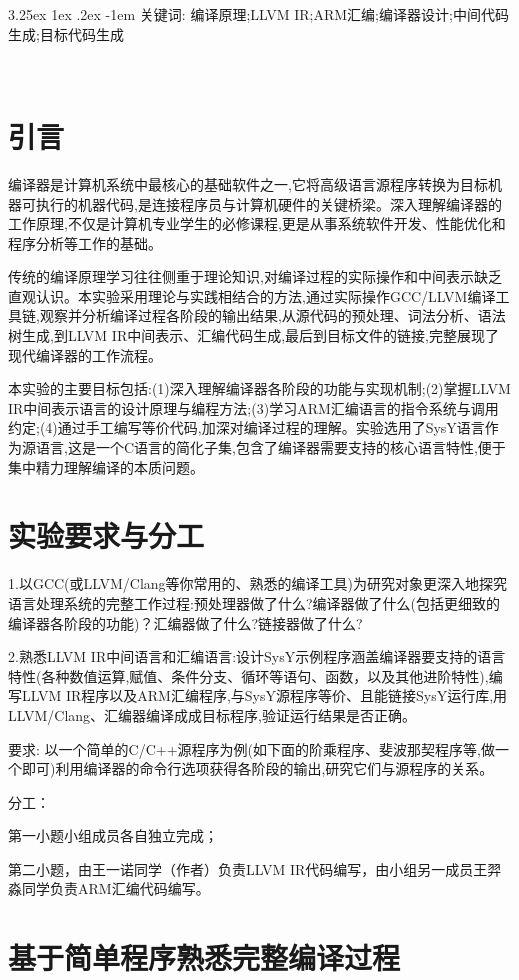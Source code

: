 \documentclass[a4paper]{article}
\makeatletter
\renewcommand\paragraph{\@startsection{paragraph}{5}{\z@}%
	{3.25ex \@plus1ex \@minus.2ex}%
	{-1em}%
	{\normalfont\normalsize\bfseries}}
\makeatother
\begin{document}
\paragraph{关键词}: 编译原理;LLVM IR;ARM汇编;编译器设计;中间代码生成;目标代码生成

​\section{引言}
编译器是计算机系统中最核心的基础软件之一,它将高级语言源程序转换为目标机器可执行的机器代码,是连接程序员与计算机硬件的关键桥梁。深入理解编译器的工作原理,不仅是计算机专业学生的必修课程,更是从事系统软件开发、性能优化和程序分析等工作的基础。

传统的编译原理学习往往侧重于理论知识,对编译过程的实际操作和中间表示缺乏直观认识。本实验采用理论与实践相结合的方法,通过实际操作GCC/LLVM编译工具链,观察并分析编译过程各阶段的输出结果,从源代码的预处理、词法分析、语法树生成,到LLVM IR中间表示、汇编代码生成,最后到目标文件的链接,完整展现了现代编译器的工作流程。

本实验的主要目标包括:(1)深入理解编译器各阶段的功能与实现机制;(2)掌握LLVM IR中间表示语言的设计原理与编程方法;(3)学习ARM汇编语言的指令系统与调用约定;(4)通过手工编写等价代码,加深对编译过程的理解。实验选用了SysY语言作为源语言,这是一个C语言的简化子集,包含了编译器需要支持的核心语言特性,便于集中精力理解编译的本质问题。

\section{实验要求与分工}
1.以GCC(或LLVM/Clang等你常用的、熟悉的编译工具)为研究对象更深入地探究语言处理系统的完整工作过程:预处理器做了什么?编译器做了什么(包括更细致的编译器各阶段的功能)？汇编器做了什么?链接器做了什么?

2.熟悉LLVM IR中间语言和汇编语言:设计SysY示例程序涵盖编译器要支持的语言特性(各种数值运算,赋值、条件分支、循环等语句、函数，以及其他进阶特性),编写LLVM IR程序以及ARM汇编程序,与SysY源程序等价、且能链接SysY运行库,用LLVM/Clang、汇编器编译成成目标程序,验证运行结果是否正确。


要求:
以一个简单的C/C++源程序为例(如下面的阶乘程序、斐波那契程序等,做一个即可)利用编译器的命令行选项获得各阶段的输出,研究它们与源程序的关系。

分工：

第一小题小组成员各自独立完成；

第二小题，由王一诺同学（作者）负责LLVM IR代码编写，由小组另一成员王羿淼同学负责ARM汇编代码编写。
\section{基于简单程序熟悉完整编译过程}
\end{document}
